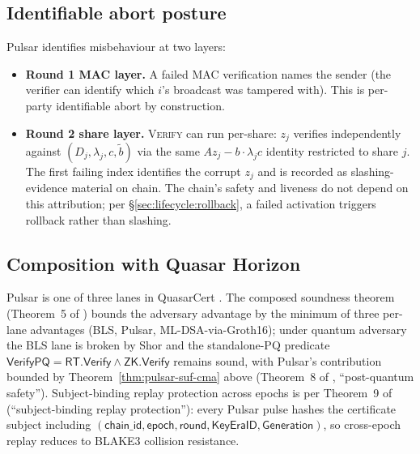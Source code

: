 \subsection{Identifiable abort posture}
\label{sec:security:identabort}

Pulsar identifies misbehaviour at two layers:
\begin{itemize}[nosep]
  \item \textbf{Round 1 MAC layer.} A failed MAC verification names
        the sender (the verifier can identify which $i$'s broadcast
        was tampered with). This is per-party identifiable abort by
        construction.
  \item \textbf{Round 2 share layer.} \textsc{Verify} can run per-share:
        $z_j$ verifies independently against
        $(D_j, \lambda_j, c, \tilde b)$ via the same $A z_j - b \cdot
        \lambda_j c$ identity restricted to share $j$. The first
        failing index identifies the corrupt $z_j$ and is recorded as
        slashing-evidence material on chain. The chain's safety and
        liveness do not depend on this attribution; per
        \S\ref{sec:lifecycle:rollback}, a failed activation
        triggers rollback rather than slashing.
\end{itemize}

\subsection{Composition with Quasar Horizon}
\label{sec:security:horizon}

Pulsar is one of three lanes in QuasarCert
\cite{quasarcertsoundness}. The composed soundness theorem
(Theorem~5 of \cite{quasarcertsoundness}) bounds the
adversary advantage by the minimum of three per-lane advantages
(BLS, Pulsar, ML-DSA-via-Groth16); under quantum adversary the BLS lane
is broken by Shor and the standalone-PQ predicate
$\mathsf{VerifyPQ} = \mathsf{RT.Verify} \land \mathsf{ZK.Verify}$
remains sound, with Pulsar's contribution bounded by
Theorem~\ref{thm:pulsar-suf-cma} above
(Theorem~8 of \cite{quasarcertsoundness}, ``post-quantum
safety''). Subject-binding
replay protection across epochs is per
Theorem~9 of \cite{quasarcertsoundness} (``subject-binding replay
protection''): every Pulsar
pulse hashes the certificate subject including
$(\mathsf{chain\_id}, \mathsf{epoch}, \mathsf{round}, \mathsf{KeyEraID},
\mathsf{Generation})$, so cross-epoch replay reduces to BLAKE3
collision resistance.
